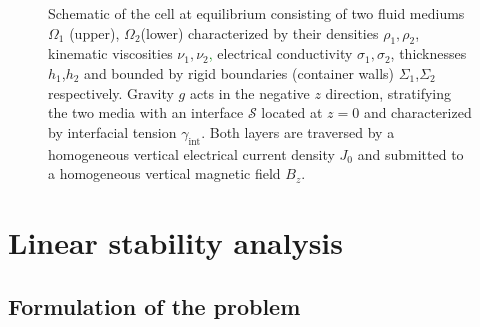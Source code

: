 \documentclass[aps,prfluids,reprint,superscriptaddress]{revtex4-2}
\newcommand{\ii}[1]{\text{#1}}
\begin{document}
\begin{figure}
	\caption{Schematic of the cell at equilibrium consisting of two fluid mediums $\Omega_1$ (upper), $\Omega_2$(lower) characterized by their densities $\rho_1,\rho_2$, kinematic viscosities $\nu_1,\nu_2$\textcolor{green}{,} electrical conductivity $\sigma_1,\sigma_2$,  thicknesses $h_1$,$h_2$ and bounded by rigid boundaries (container walls) $\Sigma_1$,$\Sigma_2$ respectively. Gravity $g$ acts in the negative $z$ direction, stratifying the two media with an interface $\mathcal{S}$ located at $z=0$ and characterized by interfacial tension $\gamma_{\ii{int}}$. Both layers are traversed by a homogeneous vertical electrical current density $J_0$ and submitted to a homogeneous vertical magnetic field $B_z$.}
	\label{fig:cell_schematic}
\end{figure}

\section{Linear stability analysis}
\label{sec:lsa}
\subsection{Formulation of the problem}
\end{document}
